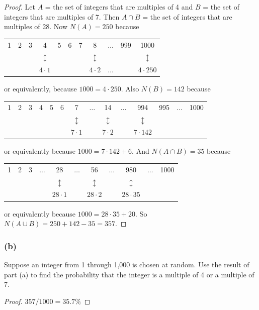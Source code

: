 \documentclass[14pt]{extarticle}
\begin{document}
\begin{proof}
Let $A$ = the set of integers that are multiples of 4 and $B$ = the set of integers that are multiples of 7. Then 
\(A \cap B\) = the set of integers that are multiples of 28. Now \(N(A) = 250\) because
\begin{tabular}{ccccccccccc}
1&2&3&4&5&6&7&8& \(\ldots\) &999&1000 \\
&&&\(\updownarrow\)&&&&\(\updownarrow\)&&&\(\updownarrow\) \\
&&&\(4 \cdot 1\)&&&&\(4 \cdot 2\)& \(\ldots\) &&\(4 \cdot 250\) \\
\end{tabular}

or equivalently, because \(1000 = 4 \cdot 250\). Also \(N(B) = 142\) because


\begin{tabular}{cccccccccccccc}
1&2&3&4&5&6&7& \(\ldots\) &14& \(\ldots\) &994&995& \(\ldots\) &1000 \\
&&&&&&\(\updownarrow\)&&\(\updownarrow\)&&\(\updownarrow\)&& \\
&&&&&&\(7 \cdot 1\)&&\(7 \cdot 2\)&&\(7 \cdot 142\)&& \\
\end{tabular}

or equivalently because \(1000 = 7 \cdot 142 + 6\). And \(N(A \cap B) = 35\) because

\begin{tabular}{ccccccccccc}
1&2&3& \(\ldots\) &28& \(\ldots\) &56& \(\ldots\) &980& \(\ldots\) &1000 \\
&&&&\(\updownarrow\)&&\(\updownarrow\)&&\(\updownarrow\)&& \\
&&&&\(28 \cdot 1\)&&\(28 \cdot 2\)&&\(28 \cdot 35\)&& \\
\end{tabular}

or equivalently because \(1000 = 28 \cdot 35 + 20\). So \(N(A \cup B) = 250 + 142 - 35 = 357\).
\end{proof}

\subsubsection{(b)}
Suppose an integer from 1 through 1,000 is chosen at random. Use the result of part (a) to find the probability that the integer is a multiple of 4 or a multiple of 7.

\begin{proof}
\(357/1000 = 35.7\%\)
\end{proof}
\end{document}
